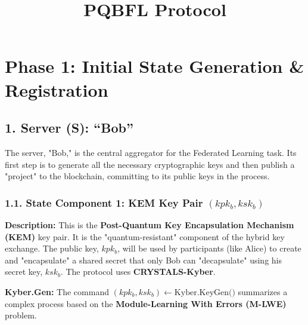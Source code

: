 \documentclass[12pt]{article}
\title{\textbf{PQBFL Protocol}}
\date{}
\begin{document}
\maketitle

\section*{Phase 1: Initial State Generation \& Registration}

\subsection*{1. Server (S): ``Bob''}

The server, "Bob," is the central aggregator for the Federated Learning task. Its first step is to generate all the necessary cryptographic keys and then publish a "project" to the blockchain, committing to its public keys in the process.

\subsubsection*{1.1. State Component 1: KEM Key Pair $(kpk_b, ksk_b)$}

\textbf{Description:}
This is the \textbf{Post-Quantum Key Encapsulation Mechanism (KEM)} key pair. It is the "quantum-resistant" component of the hybrid key exchange. The public key, $kpk_b$, will be used by participants (like Alice) to create and "encapsulate" a shared secret that only Bob can "decapsulate" using his secret key, $ksk_b$. The protocol uses \textbf{CRYSTALS-Kyber}.

\textbf{Kyber.Gen:}
The command $(kpk_b, ksk_b) \leftarrow \text{Kyber.KeyGen()}$ summarizes a complex process based on the \textbf{Module-Learning With Errors (M-LWE)} problem.
\end{document}
